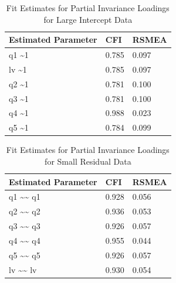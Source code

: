 \documentclass[
  man]{apa7}
\begin{document}
\begin{table}[tbp]

\begin{center}
\begin{threeparttable}

\caption{\label{tab:p-tab17}Fit Estimates for Partial Invariance Loadings for Large Intercept Data}

\begin{tabular}{lll}
\toprule
Estimated Parameter & CFI & RSMEA\\
\midrule
q1 \textasciitilde{}1 & 0.785 & 0.097\\
lv \textasciitilde{}1 & 0.785 & 0.097\\
q2 \textasciitilde{}1 & 0.781 & 0.100\\
q3 \textasciitilde{}1 & 0.781 & 0.100\\
q4 \textasciitilde{}1 & 0.988 & 0.023\\
q5 \textasciitilde{}1 & 0.784 & 0.099\\
\bottomrule
\end{tabular}

\end{threeparttable}
\end{center}

\end{table}

\begin{table}[tbp]

\begin{center}
\begin{threeparttable}

\caption{\label{tab:p-tab18}Fit Estimates for Partial Invariance Loadings for Small Residual Data}

\begin{tabular}{lll}
\toprule
Estimated Parameter & CFI & RSMEA\\
\midrule
q1 \textasciitilde{}\textasciitilde{} q1 & 0.928 & 0.056\\
q2 \textasciitilde{}\textasciitilde{} q2 & 0.936 & 0.053\\
q3 \textasciitilde{}\textasciitilde{} q3 & 0.926 & 0.057\\
q4 \textasciitilde{}\textasciitilde{} q4 & 0.955 & 0.044\\
q5 \textasciitilde{}\textasciitilde{} q5 & 0.926 & 0.057\\
lv \textasciitilde{}\textasciitilde{} lv & 0.930 & 0.054\\
\bottomrule
\end{tabular}

\end{threeparttable}
\end{center}

\end{table}
\end{document}
